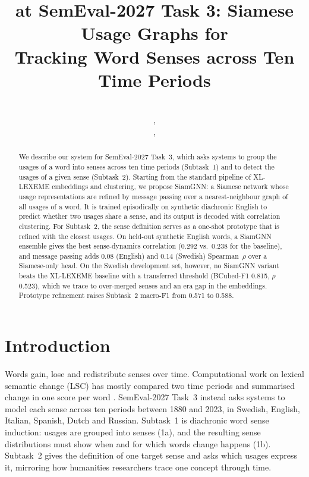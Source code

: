 \documentclass[11pt]{article}
\title{\teamname{} at SemEval-2027 Task 3: Siamese Usage Graphs for\\Tracking Word Senses across Ten Time Periods}
\author{\authorname\authornote \\
  \programme, \facultyen \\
  \university, \city \\
  \texttt{\authoremail}}
\newcommand{\sys}{SiamGNN\xspace}
\newcommand{\xll}{XL-LEXEME\xspace}
\begin{document}
\maketitle

\begin{abstract}
We describe our system for SemEval-2027 Task~3, which asks systems to group the usages of a word into senses across ten time periods (Subtask~1) and to detect the usages of a given sense (Subtask~2). Starting from the standard pipeline of \xll embeddings and clustering, we propose \sys: a Siamese network whose usage representations are refined by message passing over a nearest-neighbour graph of all usages of a word. It is trained episodically on synthetic diachronic English to predict whether two usages share a sense, and its output is decoded with correlation clustering. For Subtask~2, the sense definition serves as a one-shot prototype that is refined with the closest usages. On held-out synthetic English words, a \sys ensemble gives the best sense-dynamics correlation (0.292 vs.\ 0.238 for the baseline), and message passing adds 0.08 (English) and 0.14 (Swedish) Spearman~$\rho$ over a Siamese-only head. On the Swedish development set, however, no \sys variant beats the \xll baseline with a transferred threshold (BCubed-F1 0.815, $\rho$ 0.523), which we trace to over-merged senses and an era gap in the embeddings. Prototype refinement raises Subtask~2 macro-F1 from 0.571 to 0.588.
\end{abstract}

\section{Introduction}

Words gain, lose and redistribute senses over time. Computational work on lexical semantic change (LSC) has mostly compared two time periods and summarised change in one score per word \citep{schlechtweg2020semeval,tahmasebi2021survey}. SemEval-2027 Task~3 \citep{tahmasebi2027semeval} instead asks systems to model each sense across ten periods between 1880 and 2023, in Swedish, English, Italian, Spanish, Dutch and Russian. Subtask~1 is diachronic word sense induction: usages are grouped into senses (1a), and the resulting sense distributions must show when and for which words change happens (1b). Subtask~2 gives the definition of one target sense and asks which usages express it, mirroring how humanities researchers trace one concept through time.
\end{document}
